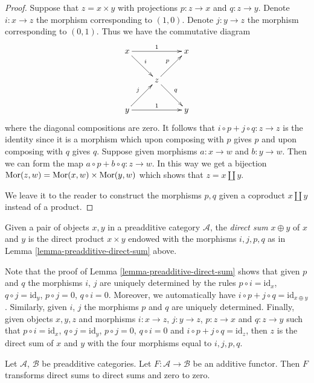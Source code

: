 \begin{proof}
Suppose that $z = x \times y$ with projections
$p : z \to x$ and $q : z \to y$. Denote $i : x \to z$
the morphism corresponding to $(1, 0)$. Denote $j : y \to z$
the morphism corresponding to $(0, 1)$. Thus we have the
commutative diagram
$$
\xymatrix{
x \ar[rr]^1 \ar[rd]^i & & x \\
& z \ar[ru]^p \ar[rd]^q & \\
y \ar[rr]^1 \ar[ru]^j & & y
}
$$
where the diagonal compositions are zero. It follows that
$i \circ p + j \circ q : z \to z$ is the identity since
it is a morphism which upon composing with $p$ gives $p$
and upon composing with $q$ gives $q$.
Suppose given morphisms $a : x \to w$ and $b : y \to w$.
Then we can form the map $a \circ p + b \circ q : z \to w$.
In this way we get a bijection $\mathop{\mathrm{Mor}}\nolimits(z, w)
= \mathop{\mathrm{Mor}}\nolimits(x, w) \times \mathop{\mathrm{Mor}}\nolimits(y, w)$ which
shows that $z = x \amalg y$.

\medskip\noindent
We leave it to the reader to construct the morphisms
$p, q$ given a coproduct $x \amalg y$ instead of a
product.
\end{proof}

\begin{definition}
\label{definition-direct-sum}
Given a pair of objects $x, y$ in a preadditive category $\mathcal{A}$,
the {\it direct sum} $x \oplus y$ of $x$ and $y$ is the direct
product $x \times y$ endowed with the morphisms
$i, j, p, q$ as in Lemma \ref{lemma-preadditive-direct-sum} above.
\end{definition}

\begin{remark}
\label{remark-direct-sum}
Note that the proof of Lemma \ref{lemma-preadditive-direct-sum}
shows that given $p$ and $q$ the morphisms $i$, $j$ are uniquely
determined by the rules $p \circ i = \text{id}_x$,
$q \circ j = \text{id}_y$, $p \circ j = 0$, $q \circ i = 0$.
Moreover, we automatically have
$i \circ p + j \circ q = \text{id}_{x \oplus y}$.
Similarly, given $i$, $j$ the morphisms $p$ and $q$ are uniquely determined.
Finally, given objects $x, y, z$ and morphisms
$i : x \to z$, $j : y \to z$, $p : z \to x$ and
$q : z \to y$ such that $p \circ i = \text{id}_x$,
$q \circ j = \text{id}_y$, $p \circ j = 0$, $q \circ i = 0$
and $i \circ p + j \circ q = \text{id}_z$, then $z$
is the direct sum of $x$ and $y$ with the four morphisms
equal to $i, j, p, q$.
\end{remark}

\begin{lemma}
\label{lemma-additive-additive}
Let $\mathcal{A}$, $\mathcal{B}$ be preadditive categories.
Let $F : \mathcal{A} \to \mathcal{B}$ be an additive functor.
Then $F$ transforms direct sums to direct sums and zero to zero.
\end{lemma}

